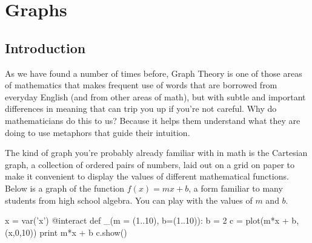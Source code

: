 \chapter{Graphs}

\section{Introduction}

As we have found a number of times before, Graph Theory is one of
those areas of mathematics that makes frequent use of words that are
borrowed from everyday English (and from other areas of math), but
with subtle and important differences in meaning that can trip you up
if you're not careful.  Why do mathematicians do this to us?  Because
it helps them understand what they are doing to use metaphors that
guide their intuition.


The kind of graph you're probably already familiar with in math is the
Cartesian graph, a collection of ordered pairs of numbers, laid out on
a grid on paper to make it convenient to display the values of
different mathematical functions.  Below is a graph of the function
$f(x) = mx + b$, a form familiar to many students from high school
algebra.  You can play with the values of $m$ and $b$.

\begin{sageverbatim}
x = var('x')
@interact
def _(m = (1..10), b=(1..10)):
    b = 2
    c = plot(m*x + b,(x,0,10))
    print m*x + b
    c.show()
\end{sageverbatim}












